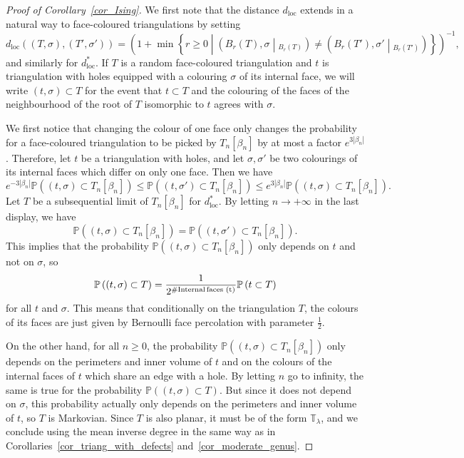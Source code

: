 \documentclass[AHL,Unicode,longabstracts,published]{cedram}
\newcommand{\loc}{\mathrm{loc}}
\newcommand{\TT}{\mathbb{T}}
\renewcommand{\P}{\mathbb{P}}
\begin{document}
\begin{proof}[Proof of Corollary~\ref{cor_Ising}]
We first note that the distance $d_{\loc}$ extends in a natural way to face-coloured triangulations by setting
\[
d_{\loc}\left((T,\sigma),(T', \sigma') \right) = \left(1+\min \left\{ r \geq 0 \middle| \left(B_r(T), \sigma\middle|_{B_r(T)} \right) \ne \left(B_r(T'), \sigma'\middle|_{B_r(T')} \right) \right\}\right)^{-1},
\]
and similarly for $d_{\loc}^*$. If $T$ is a random face-coloured triangulation and $t$ is triangulation with holes equipped with a colouring $\sigma$ of its internal face, we will write $(t,\sigma) \subset T$ for the event that $t \subset T$ and the colouring of the faces of the neighbourhood of the root of $T$ isomorphic to $t$ agrees with $\sigma$.

We first notice that changing the colour of one face only changes the probability for a face-coloured triangulation to be picked by $T_n[\beta_n]$ by at most a factor $e^{3 |\beta_n|}$. Therefore, let $t$ be a triangulation with holes, and let $\sigma, \sigma'$ be two colourings of its internal faces which differ on only one face. Then we have
\[
e^{-3\left|\beta_n\right|} \P \left((t,\sigma) \subset T_n[\beta_n] \right) \leq \P \left((t,\sigma') \subset T_n[\beta_n] \right) \leq e^{3\left|\beta_n\right|} \P \left((t,\sigma) \subset T_n[\beta_n] \right).
\]
Let $T$ be a subsequential limit of $T_n[\beta_n]$ for $d_{\loc}^*$. By letting $n \to +\infty$ in the last display, we have
\[
\P \left((t,\sigma) \subset T_n[\beta_n] \right) = \P \left((t,\sigma') \subset T_n[\beta_n] \right).
\]
This implies that the probability $\P \left((t,\sigma) \subset T_n[\beta_n] \right)$ only depends on $t$ and not on $\sigma$, so
\[
\P \left((t,\sigma) \subset T \right) = \frac{1}{2^{\# \text{Internal\,faces (t)}}} \P \left(t \subset T \right)
\]
for all $t$ and $\sigma$. This means that conditionally on the triangulation $T$, the colours of its faces are just given by Bernoulli face percolation with parameter $\frac{1}{2}$.

On the other hand, for all $n \geq 0$, the probability $\P \left((t,\sigma) \subset T_n[\beta_n] \right)$ only depends on the perimeters and inner volume of $t$ and on the colours of the internal faces of $t$ which share an edge with a hole. By letting $n$ go to infinity, the same is true for the probability $\P \left((t,\sigma) \subset T \right)$. But since it does not depend on $\sigma$, this probability actually only depends on the perimeters and inner volume of $t$, so $T$ is Markovian. Since $T$ is also planar, it must be of the form $\TT_{\lambda}$, and we conclude using the mean inverse degree in the same way as in Corollaries~\ref{cor_triang_with_defects} and~\ref{cor_moderate_genus}.
\end{proof}
\end{document}
